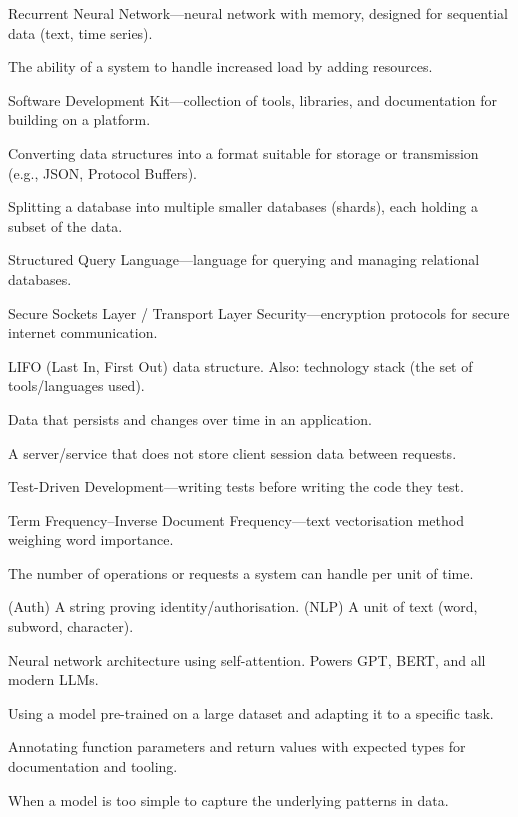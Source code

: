 \documentclass[12pt, a4paper, oneside]{book}
\begin{document}
\begin{description}[leftmargin=2em, style=nextline]
    \item[RNN] Recurrent Neural Network---neural network with memory, designed for sequential data (text, time series).
    \item[Scalability] The ability of a system to handle increased load by adding resources.
    \item[SDK] Software Development Kit---collection of tools, libraries, and documentation for building on a platform.
    \item[Serialization] Converting data structures into a format suitable for storage or transmission (e.g., JSON, Protocol Buffers).
    \item[Sharding] Splitting a database into multiple smaller databases (shards), each holding a subset of the data.
    \item[SQL] Structured Query Language---language for querying and managing relational databases.
    \item[SSL/TLS] Secure Sockets Layer / Transport Layer Security---encryption protocols for secure internet communication.
    \item[Stack] LIFO (Last In, First Out) data structure. Also: technology stack (the set of tools/languages used).
    \item[State] Data that persists and changes over time in an application.
    \item[Stateless] A server/service that does not store client session data between requests.
    \item[TDD] Test-Driven Development---writing tests before writing the code they test.
    \item[TF-IDF] Term Frequency--Inverse Document Frequency---text vectorisation method weighing word importance.
    \item[Throughput] The number of operations or requests a system can handle per unit of time.
    \item[Token] (Auth) A string proving identity/authorisation. (NLP) A unit of text (word, subword, character).
    \item[Transformer] Neural network architecture using self-attention. Powers GPT, BERT, and all modern LLMs.
    \item[Transfer Learning] Using a model pre-trained on a large dataset and adapting it to a specific task.
    \item[Type Hinting] Annotating function parameters and return values with expected types for documentation and tooling.
    \item[Underfitting] When a model is too simple to capture the underlying patterns in data.

\end{description}
\end{document}

